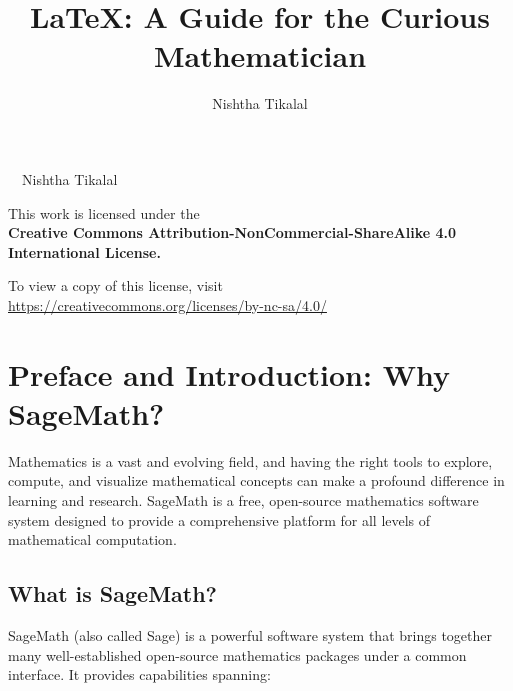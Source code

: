 \documentclass[12pt]{book}
\title{\LaTeX{}: A Guide for the Curious Mathematician}
\author{Nishtha Tikalal}
\date{} %
\begin{document}
\frontmatter
\maketitle
\cleardoublepage
\thispagestyle{empty}
\vspace*{\fill}

\begin{center}
    \textcopyright\ \the\year\ Nishtha Tikalal

    \vspace{1em}

    This work is licensed under the\\
    \textbf{Creative Commons Attribution-NonCommercial-ShareAlike 4.0 International License.}

    \vspace{1em}

    To view a copy of this license, visit\\
    \url{https://creativecommons.org/licenses/by-nc-sa/4.0/}
\end{center}

\vspace*{\fill}
\cleardoublepage
\tableofcontents


\mainmatter

\chapter*{Preface and Introduction: Why SageMath?}

Mathematics is a vast and evolving field, and having the right tools to explore, compute, and visualize mathematical concepts can make a profound difference in learning and research. SageMath is a free, open-source mathematics software system designed to provide a comprehensive platform for all levels of mathematical computation.

\section*{What is SageMath?}

SageMath (also called Sage) is a powerful software system that brings together many well-established open-source mathematics packages under a common interface. It provides capabilities spanning:
\end{document}

